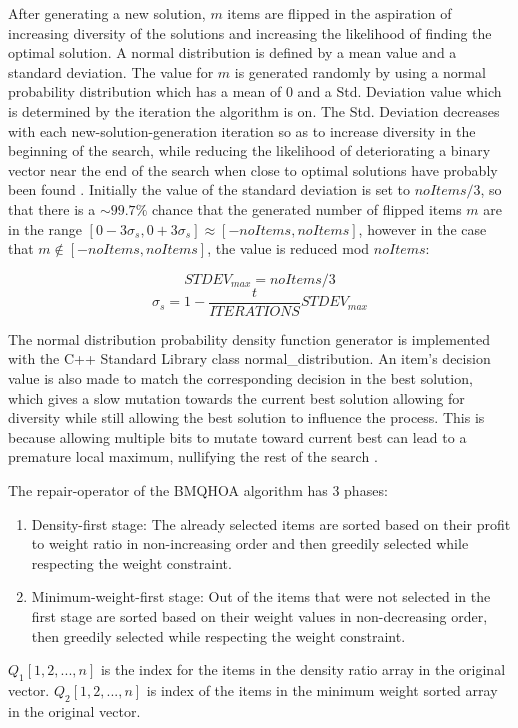 \documentclass[titlepage]{article}
\begin{document}
After generating a new solution, $m$ items are flipped in the aspiration of increasing diversity of the solutions and increasing the likelihood of finding the optimal solution. A normal distribution is defined by a mean value and a standard deviation. The value for $m$ is generated randomly by using a normal probability distribution which has a mean of $0$ and a Std. Deviation value which is determined by the iteration the algorithm is on. The Std. Deviation decreases with each new-solution-generation iteration so as to increase diversity in the beginning of the search, while reducing the likelihood of deteriorating a binary vector near the end of the search when close to optimal solutions have probably been found \cite{BMQHOA-article}. Initially the value of the standard deviation is set to $noItems/3$, so that there is a $\sim 99.7\%$ chance that the generated number of flipped items $m$ are in the range $[0-3\sigma_{s}, 0+3\sigma_{s}] \approx [-noItems, noItems]$, however in the case that $m \notin [-noItems, noItems]$, the value is reduced mod $noItems$:

$$STDEV_{max} = noItems/3$$
$$\sigma_{s} = 1-\frac{t}{ITERATIONS} STDEV_{max}$$

The normal distribution probability density function generator is implemented with the C++ Standard Library class normal\_distribution. An item's decision value is also made to match the corresponding decision in the best solution, which gives a slow mutation towards the current best solution allowing for diversity while still allowing the best solution to influence the process. This is because allowing multiple bits to mutate toward current best can lead to a premature local maximum, nullifying the rest of the search \cite{BMQHOA-article} . 

The repair-operator of the BMQHOA algorithm has 3 phases:
\begin{enumerate}
    \item Density-first stage: The already selected items are sorted based on their profit to weight ratio in non-increasing order and then greedily selected while respecting the weight constraint. 
    \item Minimum-weight-first stage: Out of the items that were not selected in the first stage are sorted based on their weight values in non-decreasing order, then greedily selected while respecting the weight constraint.   
\end{enumerate}

$Q_{1}[1, 2,...,n]$ is the index for the items in the density ratio array in the original vector. $Q_{2}[1, 2,..., n]$ is index of the items in the minimum weight sorted array in the original vector.
\end{document}

